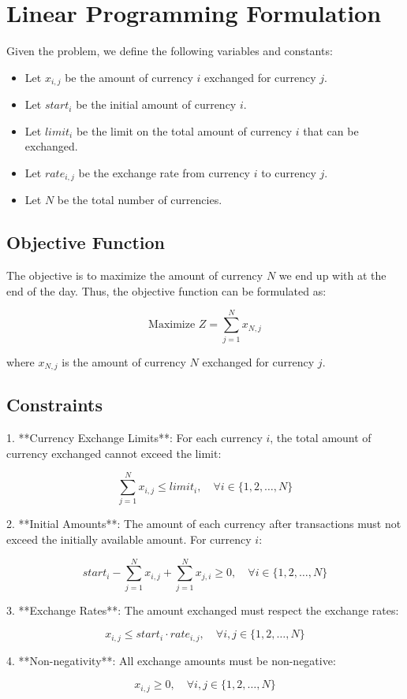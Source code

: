 \documentclass{article}
\begin{document}
\section*{Linear Programming Formulation}

Given the problem, we define the following variables and constants:

\begin{itemize}
    \item Let \( x_{i,j} \) be the amount of currency \( i \) exchanged for currency \( j \).
    \item Let \( start_i \) be the initial amount of currency \( i \).
    \item Let \( limit_i \) be the limit on the total amount of currency \( i \) that can be exchanged.
    \item Let \( rate_{i,j} \) be the exchange rate from currency \( i \) to currency \( j \).
    \item Let \( N \) be the total number of currencies.
\end{itemize}

\subsection*{Objective Function}
The objective is to maximize the amount of currency \( N \) we end up with at the end of the day. Thus, the objective function can be formulated as:

\[
\text{Maximize } Z = \sum_{j=1}^{N} x_{N,j}
\]

where \( x_{N,j} \) is the amount of currency \( N \) exchanged for currency \( j \).

\subsection*{Constraints}

1. **Currency Exchange Limits**:
   For each currency \( i \), the total amount of currency exchanged cannot exceed the limit:

   \[
   \sum_{j=1}^{N} x_{i,j} \leq limit_i, \quad \forall i \in \{1, 2, \ldots, N\}
   \]

2. **Initial Amounts**:
   The amount of each currency after transactions must not exceed the initially available amount. For currency \( i \):

   \[
   start_i - \sum_{j=1}^{N} x_{i,j} + \sum_{j=1}^{N} x_{j,i} \geq 0, \quad \forall i \in \{1, 2, \ldots, N\}
   \]

3. **Exchange Rates**:
    The amount exchanged must respect the exchange rates:

   \[
   x_{i,j} \leq start_i \cdot rate_{i,j}, \quad \forall i,j \in \{1, 2, \ldots, N\}
   \]

4. **Non-negativity**:
   All exchange amounts must be non-negative:

   \[
   x_{i,j} \geq 0, \quad \forall i,j \in \{1, 2, \ldots, N\}
   \]
\end{document}
